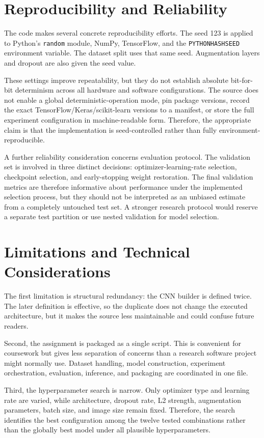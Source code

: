 \documentclass[11pt,a4paper]{article}
\newcommand{\code}[1]{\texttt{#1}}
\begin{document}
\section{Reproducibility and Reliability}
The code makes several concrete reproducibility efforts. The seed 123 is applied to Python's \code{random} module, NumPy, TensorFlow, and the \code{PYTHONHASHSEED} environment variable. The dataset split uses that same seed. Augmentation layers and dropout are also given the seed value.

These settings improve repeatability, but they do not establish absolute bit-for-bit determinism across all hardware and software configurations. The source does not enable a global deterministic-operation mode, pin package versions, record the exact TensorFlow/Keras/scikit-learn versions to a manifest, or store the full experiment configuration in machine-readable form. Therefore, the appropriate claim is that the implementation is seed-controlled rather than fully environment-reproducible.

A further reliability consideration concerns evaluation protocol. The validation set is involved in three distinct decisions: optimizer-learning-rate selection, checkpoint selection, and early-stopping weight restoration. The final validation metrics are therefore informative about performance under the implemented selection process, but they should not be interpreted as an unbiased estimate from a completely untouched test set. A stronger research protocol would reserve a separate test partition or use nested validation for model selection.

\section{Limitations and Technical Considerations}
The first limitation is structural redundancy: the CNN builder is defined twice. The later definition is effective, so the duplicate does not change the executed architecture, but it makes the source less maintainable and could confuse future readers.

Second, the assignment is packaged as a single script. This is convenient for coursework but gives less separation of concerns than a research software project might normally use. Dataset handling, model construction, experiment orchestration, evaluation, inference, and packaging are coordinated in one file.

Third, the hyperparameter search is narrow. Only optimizer type and learning rate are varied, while architecture, dropout rate, L2 strength, augmentation parameters, batch size, and image size remain fixed. Therefore, the search identifies the best configuration among the twelve tested combinations rather than the globally best model under all plausible hyperparameters.
\end{document}
